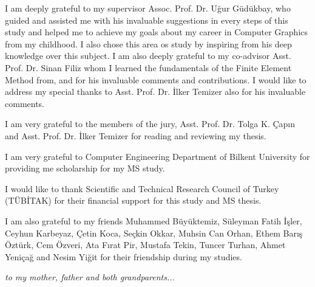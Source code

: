 \documentclass{buthesis}
\begin{document}
\begin{ack}

I am deeply grateful to my supervisor Assoc. Prof. Dr. U\u{g}ur G{\"u}d{\"u}kbay, who guided and assisted me with his invaluable suggestions in every steps of this study and helped me to achieve my goals about my career in Computer Graphics from my childhood. I also chose this area os study by inspiring from his deep knowledge over this subject. I am also deeply grateful to my co-advisor Asst. Prof. Dr. Sinan Filiz whom I learned the fundamentals of the Finite Element Method from, and for his invaluable comments and contributions. I would like to address my special thanks to Asst. Prof. Dr. \.{I}lker Temizer also for his invaluable comments.

I am very grateful to the members of the jury, Asst. Prof. Dr. Tolga K. \c{C}ap{\i}n and Asst. Prof. Dr. \.{I}lker Temizer for reading and reviewing my thesis.

I am very grateful to Computer Engineering Department of Bilkent University for providing me scholarship for my MS study.

I would like to thank Scientific and Technical Research Council of Turkey (T{\"U}B\.{I}TAK) for their financial support for this study and MS thesis.

I am also grateful to my friends Muhammed B{\"u}y{\"u}ktemiz, S{\"u}leyman Fatih \.{I}\c{s}ler, Ceyhun Karbeyaz, \c{C}etin Koca, Se\c{c}kin Okkar, Muhsin Can Orhan, Ethem Bar{\i}\c{s} {\"O}zt{\"u}rk, Cem {\"O}zveri, Ata F{\i}rat Pir, Mustafa Tekin, Tuncer Turhan, Ahmet Yeni\c{c}a\u{g} and Nesim Yi\u{g}it for their friendship during my studies.
 
\end{ack}

\newpage
\setcounter{page}{5}
\vspace*{5cm}
\begin{center}
{\large \it to my mother, father and both grandparents...}
\end{center}

\tableofcontents
\listoffigures
\listoftables
\listofalgorithms
\newpage
\newpage
%
\newpage
\pagestyle{headings}
\makeatother
\end{document}
